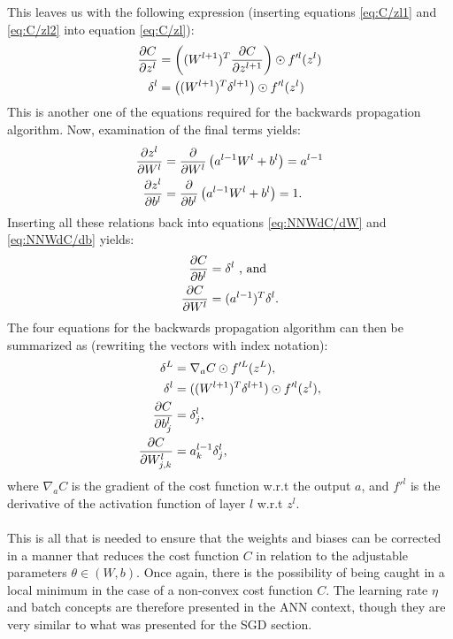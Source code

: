             This leaves us with the following expression (inserting equations \ref{eq:C/zl1} and \ref{eq:C/zl2} into equation \ref{eq:C/zl}):
            \begin{align}
                \pdv{C}{z^l} &= \left( (W^{l+1})^T \pdv{C}{z^{l+1}}  \right) \odot f'^l(z^l)\\
                \delta^l &= \left( (W^{l+1})^T \delta^{l+1}  \right) \odot f'^l(z^l)
            \end{align}
            This is another one of the equations required for the backwards propagation algorithm. Now, examination of the final terms yields:
            \begin{align}
                \pdv{z^l}{W^l} &= \pdv{}{W^l}\left( a^{l-1}W^l + b^l \right) = a^{l-1}\\
                \pdv{z^l}{b^l} &= \pdv{}{b^l}\left( a^{l-1}W^l + b^l \right) = 1.
            \end{align}
            Inserting all these relations back into equations \ref{eq:NNWdC/dW} and \ref{eq:NNWdC/db} yields:
            \begin{align}
                \pdv{C}{b^l} &= \delta^l \ \text{,  and}\\
                \pdv{C}{W^l} &= (a^{l-1})^T\delta^l.
            \end{align}
            The four equations for the backwards propagation algorithm can then be summarized as (rewriting the vectors with index notation):
            \begin{align}
                \delta^L &= \nabla_a C \odot f'^L(z^L), \\
                \delta^l &= ((W^{l+1})^T\delta^{l+1})\odot f'^l(z^l), \\
                \pdv{C}{b^l_j} &= \delta^l_j, \\
                \pdv{C}{W^l_{j,k}} &= a^{l-1}_k\delta^l_j,
            \end{align}
            where $\nabla_aC$ is the gradient of the cost function w.r.t the output $a$, and $f'^l$ is the derivative of the activation function of layer $l$ w.r.t $z^l$. \\\\
            This is all that is needed to ensure that the weights and biases can be corrected in a manner that reduces the cost function $C$ in relation to the adjustable parameters $\theta \in \left(W,b\right)$. Once again, there is the possibility of being caught in a local minimum in the case of a non-convex cost function $C$. The learning rate $\eta$ and batch concepts are therefore presented in the ANN context, though they are very similar to what was presented for the SGD section.
            
